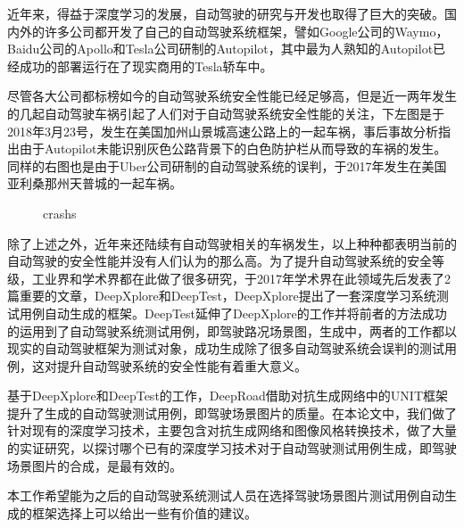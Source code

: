 \begin{cabstract}

近年来，得益于深度学习的发展，自动驾驶的研究与开发也取得了巨大的突破。国内外的许多公司都开发了自己的自动驾驶系统框架，譬如Google公司的Waymo，Baidu公司的Apollo和Tesla公司研制的Autopilot，其中最为人熟知的Autopilot已经成功的部署运行在了现实商用的Tesla轿车中。

尽管各大公司都标榜如今的自动驾驶系统安全性能已经足够高，但是近一两年发生的几起自动驾驶车祸引起了人们对于自动驾驶系统安全性能的关注，下左图是于2018年3月23号，发生在美国加州山景城高速公路上的一起车祸，事后事故分析指出由于Autopilot未能识别灰色公路背景下的白色防护栏从而导致的车祸的发生。同样的右图也是由于Uber公司研制的自动驾驶系统的误判，于2017年发生在美国亚利桑那州天普城的一起车祸。

\begin{figure}[h]
  \centering
  \caption{crashs}
\end{figure}

除了上述之外，近年来还陆续有自动驾驶相关的车祸发生，以上种种都表明当前的自动驾驶的安全性能并没有人们认为的那么高。为了提升自动驾驶系统的安全等级，工业界和学术界都在此做了很多研究，于2017年学术界在此领域先后发表了2篇重要的文章，DeepXplore\cite{DeepXplore}和DeepTest\cite{DeepTest}，DeepXplore提出了一套深度学习系统测试用例自动生成的框架。DeepTest延伸了DeepXplore的工作并将前者的方法成功的运用到了自动驾驶系统测试用例，即驾驶路况场景图，生成中，两者的工作都以现实的自动驾驶框架为测试对象，成功生成除了很多自动驾驶系统会误判的测试用例，这对提升自动驾驶系统的安全性能有着重大意义。

基于DeepXplore和DeepTest的工作，DeepRoad\cite{DeepRoad}借助对抗生成网络\cite{GAN}中的UNIT\cite{UNIT}框架提升了生成的自动驾驶测试用例，即驾驶场景图片的质量。在本论文中，我们做了针对现有的深度学习技术，主要包含对抗生成网络和图像风格转换技术，做了大量的实证研究，以探讨哪个已有的深度学习技术对于自动驾驶测试用例生成，即驾驶场景图片的合成，是最有效的。

本工作希望能为之后的自动驾驶系统测试人员在选择驾驶场景图片测试用例自动生成的框架选择上可以给出一些有价值的建议。

\end{cabstract}

